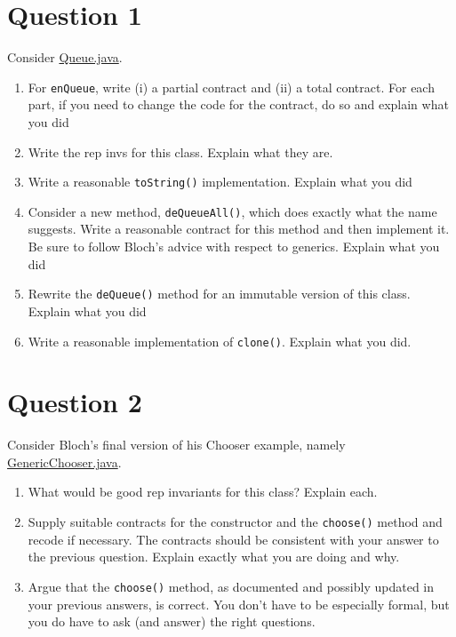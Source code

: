 \documentclass[10pt]{article}
\begin{document}
\newpage
\section{Question 1}
Consider \href{https://nguyenthanhvuh.github.io/class-oo/files/Queue.java}{Queue.java}.



\begin{enumerate}
\item For \texttt{enQueue}, write (i) a partial contract and (ii) a total contract.  For each part, if you need to change the code for the contract, do so and explain what you did

\item Write the rep invs for this class.  Explain what they are. 

\item Write a reasonable \texttt{toString()} implementation. Explain what you did

\item
Consider a new method, \texttt{deQueueAll()}, which does exactly  what the name suggests. Write a reasonable contract for this method and then implement it.  Be sure to follow Bloch's advice with respect to generics. 
Explain what you did

\item
Rewrite the \texttt{deQueue()} method for an immutable version of this class. Explain what you did

\item
Write a reasonable implementation of \texttt{clone()}. Explain what you did. 


\end{enumerate}
\newpage
\section{Question 2}

Consider Bloch's final version of his Chooser example, namely  \href{https://nguyenthanhvuh.github.io/class-oo/files/GenericChooser.java}{GenericChooser.java}.


\begin{enumerate}
\item
What would be good rep invariants for this class?  Explain each. %
\item
Supply suitable contracts for the constructor and the {\tt choose()} method
and recode if necessary.
The contracts should be consistent with your answer to the previous question.
Explain exactly what you are doing and why.
\item
Argue that the {\tt choose()} method, as documented and possibly updated
in your previous answers, is correct.  
You don't have to be especially formal, but you do have
to ask (and answer) the right questions.  
\end{enumerate}
\end{document}
